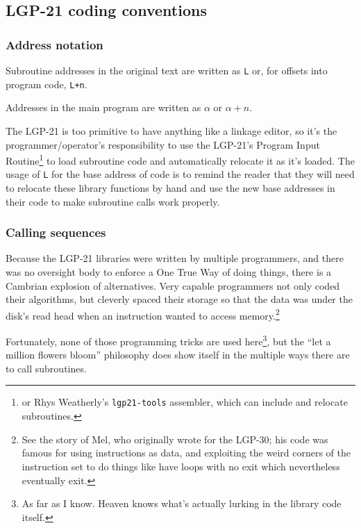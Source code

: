 \documentclass{article}
\begin{document}
\subsection{LGP-21 coding conventions}
\subsubsection{Address notation}
Subroutine addresses in the original text are written as \texttt{L} or, for offsets into program code,  \texttt{L+n}. 

Addresses in the main program are written as $\alpha$ or $\alpha+n$.

The LGP-21 is too primitive to have anything like a linkage editor, so it's the programmer/operator's responsibility to use the LGP-21's Program Input Routine\footnote{or Rhys Weatherly's \texttt{lgp21-tools} assembler, which can include and relocate subroutines.} to load subroutine code and automatically relocate it as it's loaded. The usage of \texttt{L} for the base address of code is to remind the reader that they will need to relocate these library functions by hand and use the new base addresses
in their code to make subroutine calls work properly.

\subsubsection{Calling sequences}
Because the LGP-21 libraries were written by multiple programmers, and there was no oversight body to enforce a One True Way of doing things, there is a Cambrian explosion of alternatives. Very capable programmers not only coded their algorithms, but cleverly spaced their storage so that the data was under the disk's read head when an instruction wanted to access memory.\footnote{See the story of Mel\cite{mel}, who originally wrote for the LGP-30; his code was famous for using instructions as data, and exploiting the weird corners of the instruction set to do things like have loops with no exit which nevertheless eventually exit.}

Fortunately, none of those programming tricks are used here\footnote{As far as I know. Heaven knows what's actually lurking in the library code itself.}, but the ``let a million flowers bloom'' philosophy does show itself in the multiple ways there are to call subroutines.

\label{subsec:standard-call1}
\end{document}
